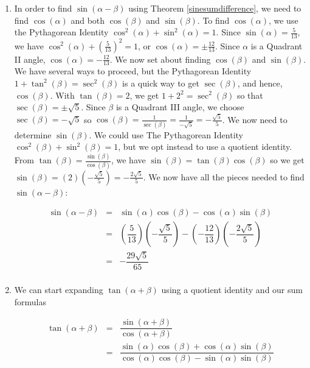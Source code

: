 \begin{ex}
\begin{enumerate}
\item  In order to find $\sin(\alpha - \beta)$ using Theorem \ref{sinesumdifference}, we need to find $\cos(\alpha)$ and both $\cos(\beta)$ and $\sin(\beta)$.  To find $\cos(\alpha)$, we use the Pythagorean Identity $\cos^2(\alpha) + \sin^2(\alpha) = 1$.  Since $\sin(\alpha) = \frac{5}{13}$, we have $\cos^{2}(\alpha) + \left(\frac{5}{13}\right)^2 = 1$, or $\cos(\alpha) = \pm \frac{12}{13}$.  Since $\alpha$ is a Quadrant II angle, $\cos(\alpha) = -\frac{12}{13}$. We now set about finding $\cos(\beta)$ and $\sin(\beta)$.  We have several ways to proceed, but the Pythagorean Identity $1 + \tan^{2}(\beta) = \sec^{2}(\beta)$ is a quick way to get $\sec(\beta)$, and hence, $\cos(\beta)$.  With $\tan(\beta) = 2$, we get $1 + 2^2 = \sec^{2}(\beta)$ so that $\sec(\beta) = \pm \sqrt{5}$.  Since $\beta$ is a Quadrant III angle,  we choose $\sec(\beta) =  -\sqrt{5}$ so $\cos(\beta) = \frac{1}{\sec(\beta)} = \frac{1}{-\sqrt{5}} = -\frac{\sqrt{5}}{5}$.  We now need to determine $\sin(\beta)$.  We could use The Pythagorean Identity $\cos^{2}(\beta) + \sin^{2}(\beta) = 1$, but we opt instead to use a quotient identity.  From $\tan(\beta) = \frac{\sin(\beta)}{\cos(\beta)}$, we have $\sin(\beta) = \tan(\beta) \cos(\beta)$ so we get $\sin(\beta) = (2) \left( -\frac{\sqrt{5}}{5}\right) = - \frac{2 \sqrt{5}}{5}$.  We now have all the pieces needed to find $\sin(\alpha - \beta)$:

\[ \begin{array}{rcl} 
\sin(\alpha - \beta) &  = & \sin(\alpha)\cos(\beta) - \cos(\alpha)\sin(\beta) \\
 										 & = & \left( \dfrac{5}{13} \right)\left( -\dfrac{\sqrt{5}}{5} \right) - \left( -\dfrac{12}{13} \right)\left( - \dfrac{2 \sqrt{5}}{5} \right) \\
 										 & = & -\dfrac{29\sqrt{5}}{65} \\
\end{array}\]

\item  We can start expanding $\tan(\alpha + \beta)$ using a quotient identity and our sum formulas

\vspace{-.1in}

\[ \begin{array}{rcl}

\tan(\alpha + \beta) & = & \dfrac{\sin(\alpha + \beta)}{\cos(\alpha + \beta)} \\ [10pt]
                     & = & \dfrac{\sin(\alpha) \cos(\beta) + \cos(\alpha) \sin(\beta)}{\cos(\alpha) \cos(\beta) - \sin(\alpha) \sin(\beta)} \\ \end{array} \]
			


\end{enumerate}
\end{ex}
